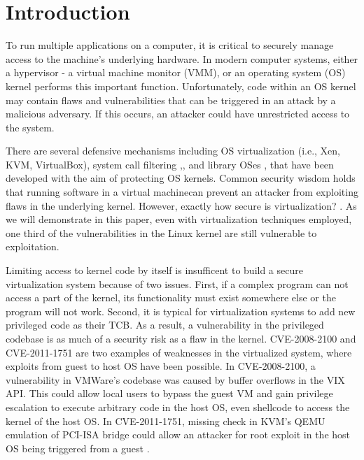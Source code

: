 \section{Introduction}
\label{sec.introduction}

To run multiple applications on a computer, it is critical to securely
manage access to the machine's underlying hardware. 
In modern computer systems, either a hypervisor - a virtual machine monitor (VMM), or an
operating system (OS) kernel performs this important function. Unfortunately, code within an OS kernel 
may contain flaws and vulnerabilities that can be triggered in an attack by a malicious adversary. 
If this occurs, an attacker could have unrestricted access to the system.


There are several defensive %
mechanisms including OS virtualization (i.e., Xen,
 KVM, VirtualBox), system call filtering \cite{Janus:99},\cite{SCI-04},
and library OSes \cite{Bascule},\cite{Drawbridge-11} that have been developed with the aim of 
protecting OS kernels. Common security wisdom holds that running software in a
virtual machinecan prevent an attacker from exploiting flaws in the underlying
kernel. However, exactly how secure is virtualization? \cite{Tal}. As we will
demonstrate in this paper, even with virtualization techniques employed, one
third of the vulnerabilities in the Linux kernel are still vulnerable to exploitation.

Limiting access to kernel code by itself is insufficent to build a secure virtualization system because of two issues. 
First, if a complex program can not access a part of the kernel, its functionality must exist somewhere else or the program will not work. 
Second, it is typical for virtualization systems to add new privileged code as their TCB.
As a result, a vulnerability in the privileged codebase is as much of a security risk as a flaw in the kernel. 
CVE-2008-2100 and CVE-2011-1751 are two examples of weaknesses in the virtualized system, where exploits from guest to host OS have been possible. 
In CVE-2008-2100, a vulnerability in VMWare's codebase was caused by buffer overflows in the VIX API. 
This could allow local users to bypass the guest VM and gain privilege escalation to execute arbitrary code in the host OS, 
even shellcode to access the kernel of the host OS. In CVE-2011-1751, missing check in KVM's QEMU emulation of PCI-ISA bridge 
could allow an attacker for root exploit in the host OS being triggered from a guest \cite{Virtunoid}. 

